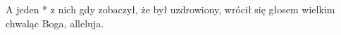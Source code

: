  A jeden * z nich gdy zobaczył, że był uzdrowiony, wrócił się głosem  wielkim chwaląc Boga, alleluja.
